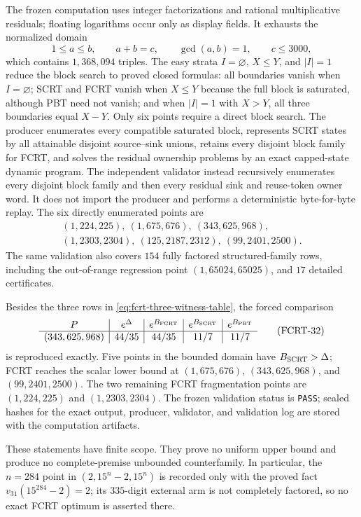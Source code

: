 The frozen computation uses integer factorizations and rational
multiplicative residuals; floating logarithms occur only as display fields.
It exhausts the normalized domain
\[
 1\le a\le b,\qquad a+b=c,\qquad\gcd(a,b)=1,\qquad c\le3000,
\tag{FCRT-31}\label{eq:fcrt-scan-domain}
\]
which contains $1{,}368{,}094$ triples.  The easy strata
$I=\varnothing$, $X\le Y$, and $|I|=1$ reduce the block search to proved
closed formulas: all boundaries vanish when $I=\varnothing$; SCRT and FCRT
vanish when $X\le Y$ because the full block is saturated, although PBT need
not vanish; and when $|I|=1$ with $X>Y$, all three boundaries equal
$X-Y$.  Only six points require a direct block search.  The producer
enumerates every compatible saturated block, represents SCRT states by all
attainable disjoint source--sink unions, retains every disjoint block family
for FCRT, and solves the residual ownership problems by an exact capped-state
dynamic program.  The independent validator instead recursively enumerates
every disjoint block family and then every residual sink and reuse-token
owner word.  It does not import the producer and performs a deterministic
byte-for-byte replay.  The six directly enumerated points are
\[
 \begin{gathered}
 (1,224,225),\ (1,675,676),\ (343,625,968),\\
 (1,2303,2304),\ (125,2187,2312),\ (99,2401,2500).
 \end{gathered}
\]
The same validation also covers $154$ fully factored structured-family rows,
including the out-of-range regression point $(1,65024,65025)$, and $17$
detailed certificates.

Besides the three rows in \eqref{eq:fcrt-three-witness-table}, the forced
comparison
\[
 \begin{array}{c|c|c|c|c}
 P&e^\Delta&e^{B_{\rm FCRT}}&e^{B_{\rm SCRT}}&e^{B_{\rm PBT}}\\ \hline
 (343,625,968)&44/35&44/35&11/7&11/7
 \end{array}
\tag{FCRT-32}\label{eq:fcrt-968-witness}
\]
is reproduced exactly.  Five points in the bounded domain have
$B_{\rm SCRT}>\Delta$; FCRT reaches the scalar lower bound at
$(1,675,676)$, $(343,625,968)$, and $(99,2401,2500)$.  The two remaining
FCRT fragmentation points are
$(1,224,225)$ and $(1,2303,2304)$.  The frozen validation status is
\texttt{PASS}; sealed hashes for the exact output, producer, validator, and
validation log are stored with the computation artifacts.

These statements have finite scope.  They prove no uniform upper bound and
produce no complete-premise unbounded counterfamily.  In particular, the
$n=284$ point in $(2,15^n-2,15^n)$ is recorded only with the proved fact
$v_{31}(15^{284}-2)=2$; its $335$-digit external arm is not completely
factored, so no exact FCRT optimum is asserted there.

